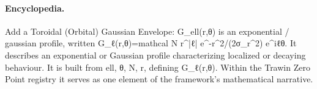 \paragraph{Encyclopedia.}
Add a Toroidal (Orbital) Gaussian Envelope: G\_ell(r,θ) is an exponential / gaussian profile, written G\_ℓ(r,θ)=mathcal N r\textasciicircum{}|ℓ| e\textasciicircum{}-r\textasciicircum{}2/(2σ\_r\textasciicircum{}2) e\textasciicircum{}iℓθ. It describes an exponential or Gaussian profile characterizing localized or decaying behaviour. It is built from ell, θ, N, r, defining G\_ℓ(r,θ). Within the Trawin Zero Point registry it serves as one element of the framework's mathematical narrative.
